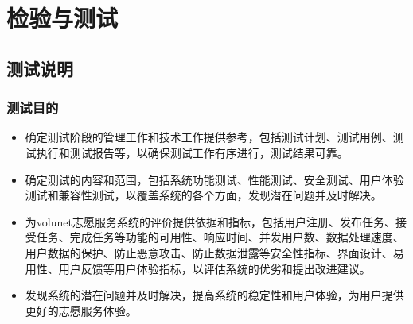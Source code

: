 \section{检验与测试}

\subsection{测试说明}
\subsubsection{测试目的}
\begin{itemize}[itemsep=2pt,topsep=0pt,parsep=4pt,itemindent=1em]
    \item 确定测试阶段的管理工作和技术工作提供参考，包括测试计划、测试用例、测试执行和测试报告等，以确保测试工作有序进行，测试结果可靠。
    \item 确定测试的内容和范围，包括系统功能测试、性能测试、安全测试、用户体验测试和兼容性测试，以覆盖系统的各个方面，发现潜在问题并及时解决。
    \item 为volunet志愿服务系统的评价提供依据和指标，包括用户注册、发布任务、接受任务、完成任务等功能的可用性、响应时间、并发用户数、数据处理速度、用户数据的保护、防止恶意攻击、防止数据泄露等安全性指标、界面设计、易用性、用户反馈等用户体验指标，以评估系统的优劣和提出改进建议。
    \item 发现系统的潜在问题并及时解决，提高系统的稳定性和用户体验，为用户提供更好的志愿服务体验。
\end{itemize}

